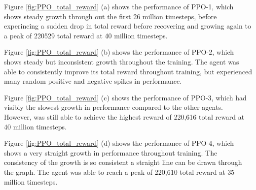 Figure \ref{fig:PPO_total_reward} (a) shows the performance of PPO-1, which shows steady growth through out the first 26 million timesteps, before experincing a sudden drop in total reward before recovering and growing again to a peak of 220529 total reward at 40 million timesteps.

Figure \ref{fig:PPO_total_reward} (b) shows the performance of PPO-2, which shows steady but inconsistent growth throughout the training. The agent was able to consistently improve its total reward throughout training, but experienced many random positive and negative spikes in performance.

Figure \ref{fig:PPO_total_reward} (c) shows the performance of PPO-3, which had visibly the slowest growth in performance compared to the other agents. However, was still able to achieve the highest reward of 220,616 total reward at 40 million timesteps.

Figure \ref{fig:PPO_total_reward} (d) shows the performance of PPO-4, which shows a very straight growth in performance throughout training. The consistency of the growth is so consistent a straight line can be drawn through the graph. The agent was able to reach a peak of 220,610 total reward at 35 million timesteps.


